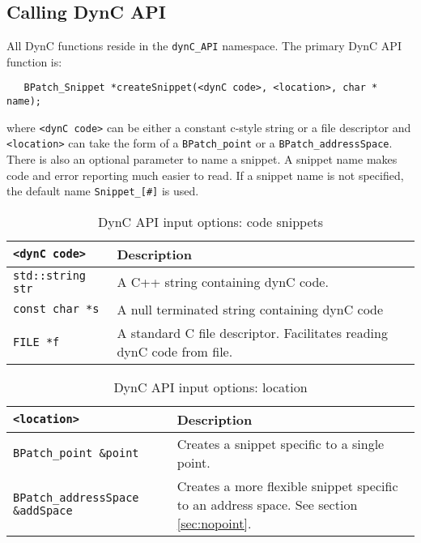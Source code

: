 \documentclass{article}
\begin{document}

\subsection{Calling DynC API}
All DynC functions reside in the \verb!dynC_API! namespace. The primary DynC API function is:
\begin{lstlisting}
   BPatch_Snippet *createSnippet(<dynC code>, <location>, char * name);
\end{lstlisting}
where \verb!<dynC code>! can be either a constant c-style string or a file descriptor and \verb!<location>! can take the form of a \verb!BPatch_point! or a \verb!BPatch_addressSpace!. There is also an optional parameter to name a snippet. A snippet name makes code and error reporting much easier to read. If a snippet name is not specified, the default name \verb!Snippet_[#]! is used.
\\

\begin{centering}

\begin{table}[!th]
\begin{tabular}{|l|p{11cm}|}
\hline
\verb!<dynC code>! & Description\\
\hline
\verb!std::string str! & A C++ string containing dynC code.\\
\hline
\verb!const char *s! & A null terminated string containing dynC code\\
\hline 
\verb!FILE *f! & A standard C file descriptor. Facilitates reading dynC code from file.\\
\hline

\end{tabular}
\caption{DynC API input options: code snippets}
\end{table}

\begin{table}[!th]
\begin{tabular}{|l|p{8cm}|}
\hline
\verb!<location>! & Description\\
\hline
\verb!BPatch_point &point! & Creates a snippet specific to a single point.\\
\hline
\verb!BPatch_addressSpace &addSpace! & Creates a more flexible snippet specific to an address space. See section \ref{sec:nopoint}.\\
\hline
\end{tabular}
\caption{DynC API input options: location}
\end{table}

\end{centering}
\end{document}
